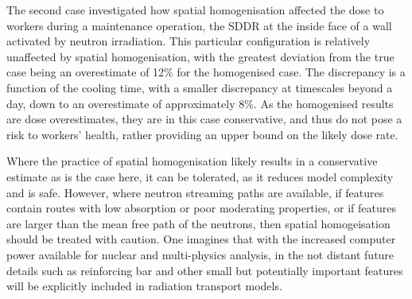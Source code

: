 The second case investigated how spatial homogenisation affected the dose to workers during a maintenance operation, the SDDR at the inside face of a wall activated by neutron irradiation. This particular configuration is relatively unaffected by spatial homogenisation, with the greatest deviation from the true case being an overestimate of 12\% for the homogenised case. The discrepancy is a function of the cooling time, with a smaller discrepancy at timescales beyond a day, down to an overestimate of approximately 8\%. As the homogenised results are dose overestimates, they are in this case conservative, and thus do not pose a risk to workers' health, rather providing an upper bound on the likely dose rate. 

Where the practice of spatial homogenisation likely results in a conservative estimate as is the case here, it can be tolerated, as it reduces model complexity and is safe. However, where neutron streaming paths are available, if features contain routes with low absorption or poor moderating properties, or if features are larger than the mean free path of the neutrons, then spatial homogeisation should be treated with caution. One imagines that with the increased computer power available for nuclear and multi-physics analysis, in the not distant future details such as reinforcing bar and other small but potentially important features will be explicitly included in radiation transport models. 



